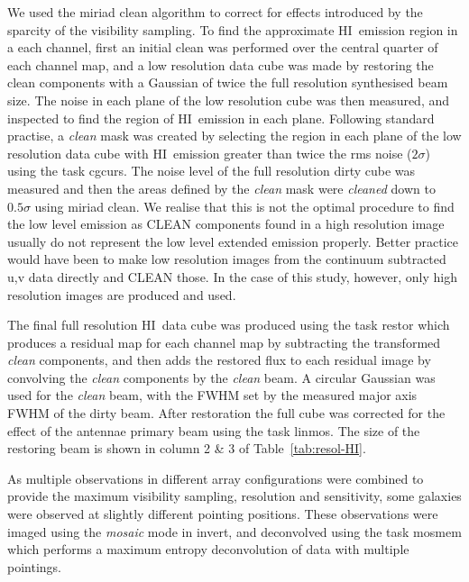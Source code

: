 \documentclass[traditabstract]{aa} %
\newcommand\HI{H{\small I}}
\begin{document}
\begin{appendix}
We used the {\sc miriad} {\sc clean} algorithm to correct for effects
introduced by the sparcity of the visibility sampling. To find the
approximate \HI\ emission region in a each channel, first an initial
{\sc clean} was performed over the central quarter of each channel
map, and a low resolution data cube was made by restoring the clean
components with a Gaussian of twice the full resolution synthesised
beam size. The noise in each plane of the low resolution cube was then
measured, and inspected to find the region of \HI\ emission in each
plane. Following standard practise, a {\it clean} mask was created by
selecting the region in each plane of the low resolution data cube
with \HI\ emission greater than twice the rms noise ($2\sigma$) using
the task {\sc cgcurs}. The noise level of the full resolution
dirty cube was measured and then the areas defined by the {\it clean}
mask were {\it cleaned} down to $0.5\sigma$ using {\sc miriad} {\sc clean}.
We realise that this is not the optimal procedure
to find the low level emission as CLEAN components found in a high
resolution image usually do not represent the low level extended
emission properly. Better practice would have been to make low resolution images
from the continuum subtracted u,v data directly and CLEAN those. In the
case of this study, however, only high resolution images are produced and
used. 

The final full resolution \HI\ data cube was produced using the
task {\sc restor} which produces a residual map for each channel
map by subtracting the transformed {\em clean} components, and then
adds the restored flux
to each residual image by convolving the {\em
  clean} components by the {\em clean} beam. A circular Gaussian was
used for the {\em clean} beam, with the FWHM set by the measured major axis
FWHM of the dirty beam. After restoration the full cube was corrected
for the effect of the antennae primary beam using the task {\sc
  linmos}. The size of the restoring beam is shown in column 2 \& 3 of
Table~\ref{tab:resol-HI}.

As multiple observations in different array configurations were
combined to provide the maximum visibility sampling, resolution and
sensitivity,
some galaxies were observed at slightly different pointing
positions. These observations were imaged using the {\em mosaic} mode
in {\sc invert}, and deconvolved using the task {\sc mosmem}
which performs a maximum entropy deconvolution of data with multiple
pointings.


\end{appendix}
\end{document}
